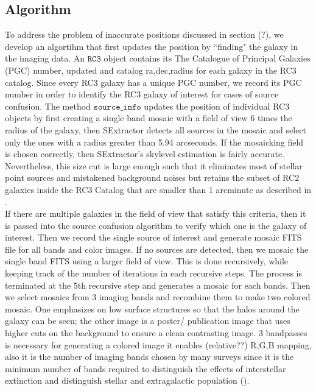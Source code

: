 \documentclass[5p]{elsarticle}
\begin{document}
	\subsection{Algorithm}
	To address the problem of inaccurate positions discussed in section (?), we develop an algortihm that first updates the position by ``finding" the galaxy in the imaging data. 
	An  $\texttt{RC3}$ object contains its The Catalogue of Principal Galaxies (PGC) number, updated and catalog ra,dec,radius for each galaxy in the RC3 catalog. Since every RC3 galaxy has a unique PGC number, we record  its PGC number in order to identify the RC3 galaxy of interest for cases of source confusion. The method $\texttt{source\_info}$ updates the position of individual RC3 objects by first creating a single band mosaic with a field of view 6 times the radius of the galaxy, then SExtractor detects all sources in the mosaic and select only the ones with a radius greater than 5.94 arcseconds.  If the mosaicking field is chosen correctly, then SExtractor's skylevel estimation is fairly accurate.  Nevertheless, this size cut is large enough such that it eliminates most of stellar point sources and mistakened background noises  but retains the subset of RC2 galaxies inside the RC3 Catalog that are smaller than 1 arcminute as described in \citet{rc2}. 
\\
\indent If there are multiple galaxies in the field of view that satisfy this criteria, then it is passed into the source confusion algorithm to verify which one is the galaxy of interest. Then we record the single source of interest and generate mosaic FITS file for all bands and color images. If no sources are detected, then we mosaic  the single band FITS using a larger field of view. This is done recursively, while keeping track of the number of iterations in each recursive steps. The process is terminated at the 5th recursive step and generates a mosaic for each bands. Then we select mosaics from 3 imaging bands  and recombine them to make two  colored mosaic. One emphasizes on low surface structures  so that the halos around the galaxy can be seen; the other image is a poster/ publication image that uses higher cuts on the background to ensure a clean contrasting image. 3 bandpasses is necessary for generating a colored image it enables (relative??) R,G,B mapping, also it is the number of imaging bands chosen by many surveys since it is the minimum number of bands required to distinguish the effects of interstellar extinction and distinguish stellar and extragalactic population (\citet{2mass}).
\end{document}

